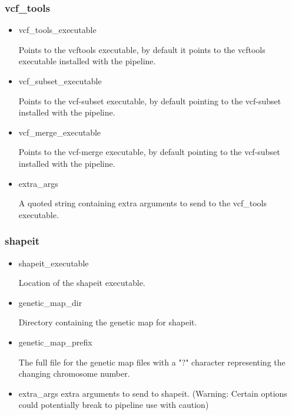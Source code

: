 \subsubsection{vcf\_tools}
\begin{itemize}
\item vcf\_tools\_executable 

Points to the vcftools executable, by default it points to the vcftools executable installed with the pipeline.
\item vcf\_subset\_executable 

Points to the vcf-subset executable, by default pointing to the vcf-subset installed with the pipeline.
\item vcf\_merge\_executable

Points to the vcf-merge executable, by default pointing to the vcf-subset installed with the pipeline.
\item extra\_args 

A quoted string containing extra arguments to send to the vcf\_tools executable.
\end{itemize}
\subsubsection{shapeit}
\begin{itemize}
\item shapeit\_executable

Location of the shapeit executable.
\item genetic\_map\_dir 

Directory containing the genetic map for shapeit.
\item genetic\_map\_prefix 

The full file for the genetic map files with a "?" character representing the changing chromosome number.
\item extra\_args 
extra arguments to send to shapeit. (Warning: Certain options could potentially break to pipeline use with caution)
\end{itemize}
